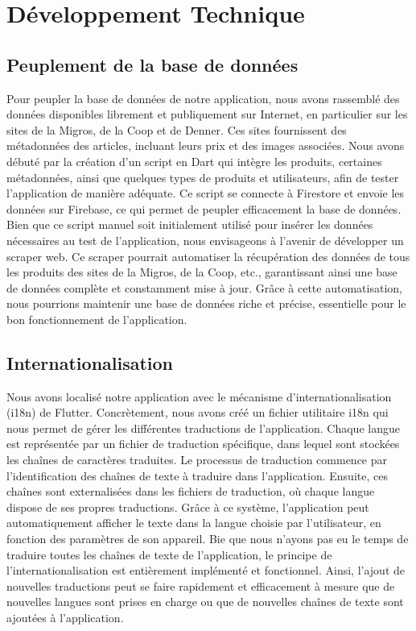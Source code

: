 \section{Développement Technique}

\subsection{Peuplement de la base de données}

Pour peupler la base de données de notre application, nous avons rassemblé des données disponibles librement et publiquement sur Internet, en particulier sur les sites de la Migros, de la Coop et de Denner. Ces sites fournissent des métadonnées des articles, incluant leurs prix et des images associées. Nous avons débuté par la création d'un script en Dart qui intègre les produits, certaines métadonnées, ainsi que quelques types de produits et utilisateurs, afin de tester l'application de manière adéquate. Ce script se connecte à Firestore et envoie les données sur Firebase, ce qui permet de peupler efficacement la base de données. Bien que ce script manuel soit initialement utilisé pour insérer les données nécessaires au test de l'application, nous envisageons à l'avenir de développer un scraper web. Ce scraper pourrait automatiser la récupération des données de tous les produits des sites de la Migros, de la Coop, etc., garantissant ainsi une base de données complète et constamment mise à jour. Grâce à cette automatisation, nous pourrions maintenir une base de données riche et précise, essentielle pour le bon fonctionnement de l'application.

\subsection{Internationalisation}
\label{sec:i18n}

Nous avons localisé notre application avec le mécanisme d'internationalisation (i18n) de Flutter. Concrètement, nous avons créé un fichier utilitaire i18n qui nous permet de gérer les différentes traductions de l'application. Chaque langue est représentée par un fichier de traduction spécifique, dans lequel sont stockées les chaînes de caractères traduites. Le processus de traduction commence par l'identification des chaînes de texte à traduire dans l'application. Ensuite, ces chaînes sont externalisées dans les fichiers de traduction, où chaque langue dispose de ses propres traductions. Grâce à ce système, l'application peut automatiquement afficher le texte dans la langue choisie par l'utilisateur, en fonction des paramètres de son appareil. Bie que nous n'ayons pas eu le temps de traduire toutes les chaînes de texte de l'application, le principe de l'internationalisation est entièrement implémenté et fonctionnel. Ainsi, l'ajout de nouvelles traductions peut se faire rapidement et efficacement à mesure que de nouvelles langues sont prises en charge ou que de nouvelles chaînes de texte sont ajoutées à l'application.

